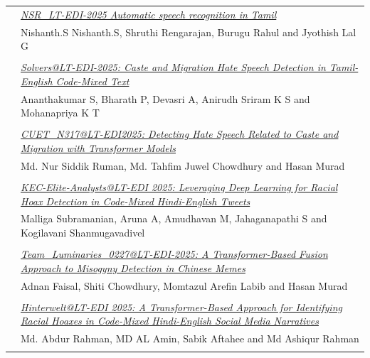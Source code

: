 \documentclass[11pt,oneside]{book}
\begin{document}
\begin{tabular}{p{24mm}p{124mm}}
                      & \hyperlink{page.95}{\emph{NSR\_LT-EDI-2025 Automatic speech recognition in Tamil}}\\
        & Nishanth.S Nishanth.S\index{Nishanth.S}, Shruthi Rengarajan\index{Rengarajan}, Burugu Rahul\index{Rahul} and Jyothish Lal G\index{G}\\\\
                
                      & \hyperlink{page.100}{\emph{Solvers@LT-EDI-2025: Caste and Migration Hate Speech Detection in Tamil-English Code-Mixed Text}}\\
        & Ananthakumar S\index{S}, Bharath P\index{P}, Devasri A\index{A}, Anirudh Sriram K S\index{S} and Mohanapriya K T\index{T}\\\\
                
                      & \hyperlink{page.105}{\emph{CUET\_N317@LT-EDI2025: Detecting Hate Speech Related to Caste and Migration with Transformer Models}}\\
        & Md. Nur Siddik Ruman\index{Ruman}, Md. Tahfim Juwel Chowdhury\index{Chowdhury} and Hasan Murad\index{Murad}\\\\
                
                      & \hyperlink{page.111}{\emph{KEC-Elite-Analysts@LT-EDI 2025: Leveraging Deep Learning for Racial Hoax Detection in Code-Mixed Hindi-English Tweets}}\\
        & Malliga Subramanian\index{Subramanian}, Aruna A\index{A}, Amudhavan M\index{M}, Jahaganapathi S\index{S} and Kogilavani Shanmugavadivel\index{Shanmugavadivel}\\\\
                
                      & \hyperlink{page.116}{\emph{Team\_Luminaries\_0227@LT-EDI-2025: A Transformer-Based Fusion Approach to Misogyny Detection in Chinese Memes}}\\
        & Adnan Faisal\index{Faisal}, Shiti Chowdhury\index{Chowdhury}, Momtazul Arefin Labib\index{Labib} and Hasan Murad\index{Murad}\\\\
                
                      & \hyperlink{page.121}{\emph{Hinterwelt@LT-EDI 2025: A Transformer-Based Approach for Identifying Racial Hoaxes in Code-Mixed Hindi-English Social Media Narratives}}\\
        & Md. Abdur Rahman\index{Rahman}, MD AL Amin\index{Amin}, Sabik Aftahee\index{Aftahee} and Md Ashiqur Rahman\index{Rahman}\\\\
              \end{tabular}
    \newpage
      
\end{document}
